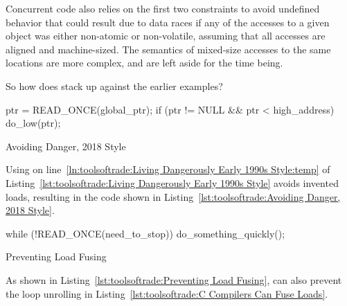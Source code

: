 Concurrent code also relies on the first two constraints to avoid
undefined behavior that could result due to data races if any of the
accesses to a given object was either non-atomic or non-volatile,
assuming that all accesses are aligned and machine-sized.
The semantics of mixed-size accesses to the same locations are more
complex, and are left aside for the time being.

So how does  stack up against the earlier examples?

\begin{listing}[tbp]
\begin{fcvlabel}
\begin{VerbatimL}[commandchars=\\\{\}]
ptr = READ_ONCE(global_ptr);
if (ptr != NULL && ptr < high_address)
	do_low(ptr);
\end{VerbatimL}
\end{fcvlabel}
\caption{Avoiding Danger, 2018 Style}
\label{lst:toolsoftrade:Avoiding Danger, 2018 Style}
\end{listing}

Using  on
line~\ref{ln:toolsoftrade:Living Dangerously Early 1990s Style:temp} of
Listing~\ref{lst:toolsoftrade:Living Dangerously Early 1990s Style}
avoids invented loads,
resulting in the code shown in
Listing~\ref{lst:toolsoftrade:Avoiding Danger, 2018 Style}.

\begin{listing}[tbp]
\begin{fcvlabel}
\begin{VerbatimL}[commandchars=\\\{\}]
while (!READ_ONCE(need_to_stop))
	do_something_quickly();
\end{VerbatimL}
\end{fcvlabel}
\caption{Preventing Load Fusing}
\label{lst:toolsoftrade:Preventing Load Fusing}
\end{listing}

As shown in
Listing~\ref{lst:toolsoftrade:Preventing Load Fusing},
 can also prevent the loop unrolling in
Listing~\ref{lst:toolsoftrade:C Compilers Can Fuse Loads}.

